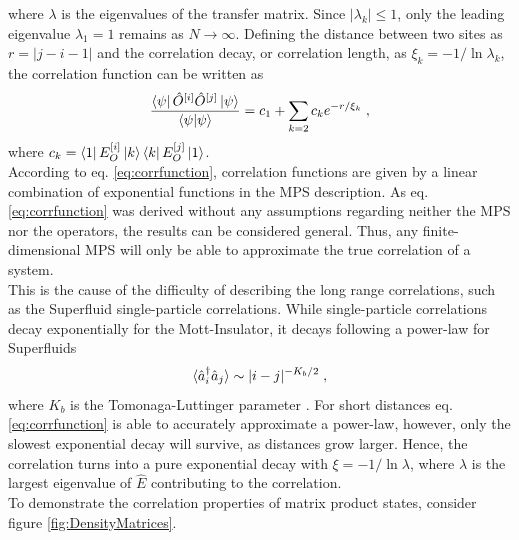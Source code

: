 where $\lambda$ is the eigenvalues of the transfer matrix. Since $|\lambda_k| \leq 1 $, only the leading eigenvalue $\lambda_1 = 1$ remains as $N \to \infty$. Defining the distance between two sites as $r = |j - i -1|$ and the correlation decay, or correlation length, as $\xi_k = -1/\ln \lambda_k$, the correlation function can be written as
\begin{equation}
	\frac{\bra{\psi} \hat{O}^{[i]} \hat{O}^{[j]} \ket{\psi}}{\braket{\psi | \psi}} = c_1 + \sum_{k = 2} c_k e^{-r/ \xi_k} \; , \label{eq:corrfunction}
\end{equation}
where $c_k = \bra{1} E_{O}^{[i]} \ket{k} \bra{k} E_{O}^{[j]} \ket{1}$. \cite{schollwock} \\
According to eq. \eqref{eq:corrfunction}, correlation functions are given by a linear combination of exponential functions in the MPS description. As eq. \eqref{eq:corrfunction} was derived without any assumptions regarding neither the MPS nor the operators, the results can be considered general. Thus, any finite-dimensional MPS will only be able to approximate the true correlation of a system.\\
This is the cause of the difficulty of describing the long range correlations, such as the Superfluid single-particle correlations. While single-particle correlations decay exponentially for the Mott-Insulator, it decays following a power-law for Superfluids
\begin{equation}
	\braket{\hat{a}_{i}^{\dag} \hat{a}_{j}} \sim |i - j|^{-K_b /2} \; ,
	\label{eq:superfluidCorrelation}
\end{equation}
where $K_b$ is the Tomonaga-Luttinger parameter \cite{characPhases}. For short distances eq. \eqref{eq:corrfunction} is able to accurately approximate a power-law, however, only the slowest exponential decay will survive, as distances grow larger. Hence, the correlation turns into a pure exponential decay with $\xi = -1/ \ln \lambda$, where $\lambda$ is the largest eigenvalue of $\hat{E}$ contributing to the correlation.\\
To demonstrate the correlation properties of matrix product states, consider figure \ref{fig:DensityMatrices}.
